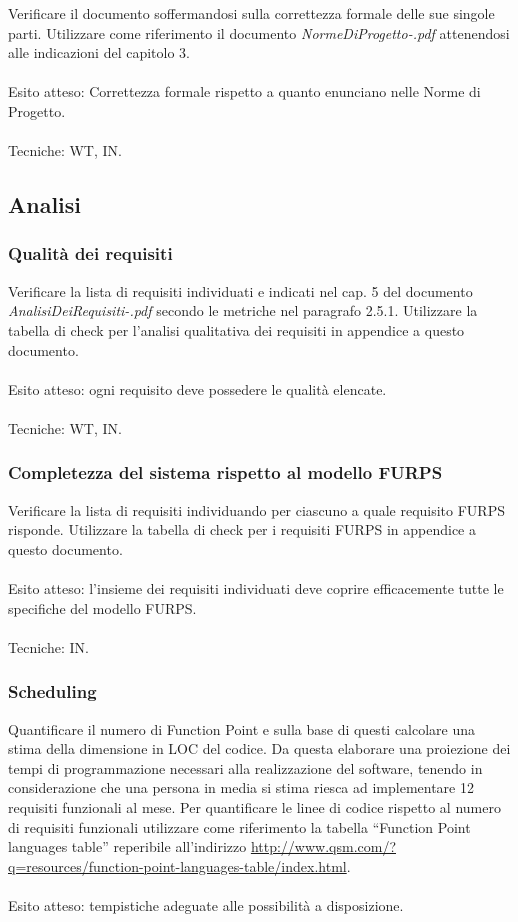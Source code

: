 Verificare il documento soffermandosi sulla correttezza formale delle sue 
singole parti. Utilizzare come riferimento il documento
\emph{NormeDiProgetto-\versionenormeprogetto.pdf} attenendosi alle indicazioni del capitolo 3.
\\\\
Esito atteso: Correttezza formale rispetto a quanto enunciano nelle Norme di
Progetto.
\\\\
Tecniche: WT, IN.


\subsection{Analisi}

\subsubsection*{Qualit\`a dei requisiti}

Verificare la lista di requisiti individuati e indicati nel cap. 5 del documento
\emph{AnalisiDeiRequisiti-\versioneAR.pdf} secondo le metriche nel paragrafo 2.5.1.
Utilizzare la tabella di check per l'analisi qualitativa dei requisiti in
appendice a questo documento.
\\\\
Esito atteso: ogni requisito deve possedere le qualit\`a elencate.
\\\\
Tecniche: WT, IN.


\subsubsection*{Completezza del sistema rispetto al modello FURPS}

Verificare la lista di requisiti individuando per ciascuno a quale requisito
FURPS risponde. Utilizzare la tabella di check per i requisiti FURPS in
appendice a questo documento.
\\\\
Esito atteso: l'insieme dei requisiti individuati deve coprire
efficacemente tutte le specifiche del modello FURPS.
\\\\ Tecniche: IN.

\subsubsection*{Scheduling}

Quantificare il numero di Function Point e sulla base di questi calcolare una
stima della dimensione in LOC del codice. Da questa elaborare una proiezione dei
tempi di programmazione necessari alla realizzazione del software, tenendo in
considerazione che una persona in media si stima riesca ad implementare 12
requisiti funzionali al mese. Per quantificare le linee di codice
rispetto al numero di requisiti funzionali utilizzare come riferimento la
tabella ``Function Point languages table'' reperibile all'indirizzo
\url{http://www.qsm.com/?q=resources/function-point-languages-table/index.html}.
\\\\
Esito atteso: tempistiche adeguate alle possibilit\`a a disposizione.


